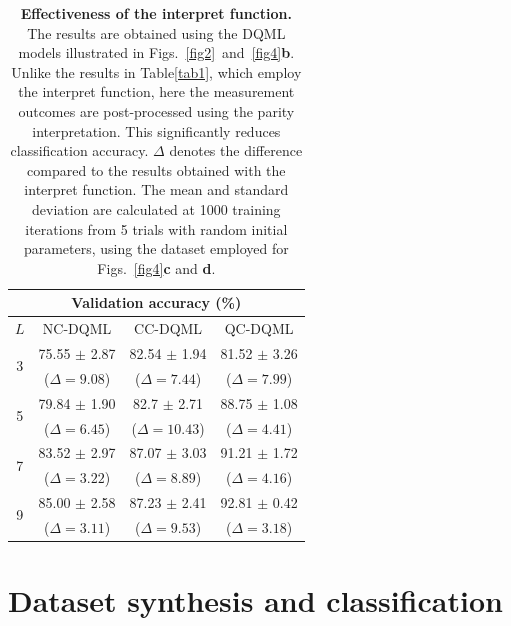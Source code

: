 \documentclass[aps,prx,reprint,amsmath,amssymb,superscriptaddress,nobibnotes,showpacs]{revtex4-2}
\begin{document}
\begin{table}[h!]
\centering
\begin{tabular}{      c||c|c|c  }

 \hline

 \multicolumn{4}{c}{Validation accuracy (\%)} \\
 \hline
 \multirow{2}{*}{$L$}  & \multirow{2}{*}{NC-DQML}  & \multirow{2}{*}{CC-DQML} & \multirow{2}{*}{QC-DQML}\\
 &&&\\

 
 \hline

 \multirow{2}{*}{3} & 75.55 $\pm$ 2.87 & 82.54 $\pm$ 1.94 & 81.52 $\pm$ 3.26 \\[1pt]
  &($\Delta=9.08$)&($\Delta=7.44$)&($\Delta=7.99$)\\

 \hline
 \multirow{2}{*}{5}   & 79.84 $\pm$ 1.90 & 82.7 $\pm$ 2.71 & 88.75 $\pm$ 1.08 \\[1pt]
 &($\Delta=6.45$)&($\Delta=10.43$)&($\Delta=4.41$)\\
 
\hline

 \multirow{2}{*}{7}
& 83.52 $\pm$ 2.97 & 87.07 $\pm$ 3.03 & 91.21 $\pm$ 1.72 \\[1pt]
&($\Delta=3.22$)&($\Delta=8.89$)&($\Delta=4.16$)\\

 \hline
 \multirow{2}{*}{9} & 85.00 $\pm$ 2.58 & 87.23 $\pm$ 2.41 & 92.81 $\pm$ 0.42 \\[1pt]
&($\Delta=3.11$)&($\Delta=9.53$)&($\Delta=3.18$)\\

\hline
\end{tabular}
\caption{\textbf{Effectiveness of the interpret function.} The results are obtained using the DQML models illustrated in Figs.~\ref{fig2}~and~\ref{fig4}\textbf{b}. Unlike the results in Table\ref{tab1}, which employ the interpret function, here the measurement outcomes are post-processed using the parity interpretation. This significantly reduces classification accuracy. $\Delta$ denotes the difference compared to the results obtained with the interpret function. The mean and standard deviation are calculated at 1000 training iterations from 5 trials with random initial parameters, using the dataset employed for Figs.~\ref{fig4}\textbf{c} and \textbf{d}.}
\label{tab2}
\end{table}



\section{Dataset synthesis and classification}\label{appB}
\end{document}
